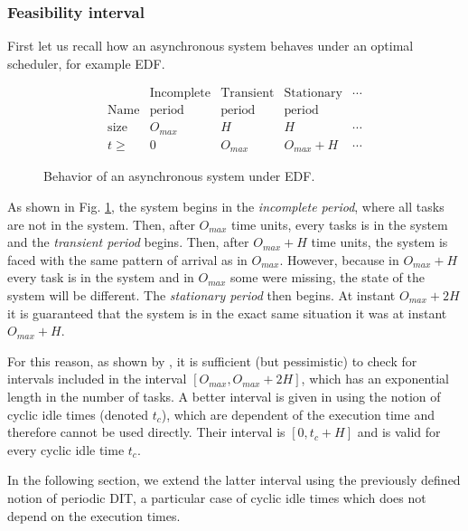 \documentclass[conference]{IEEEtran}
\begin{document}
		\subsubsection{Feasibility interval}
			First let us recall how an asynchronous system behaves under an optimal
			scheduler, for example EDF.

			\begin{figure}[h]
				\[
					\begin{array}{r||c|c|c|l}
									& \text{Incomplete} & \text{Transient}	& \text{Stationary} & \cdots \\
						\text{Name} & \text{period} 	& \text{period} 	& \text{period}  	& \\ \hline
						\text{size} & O_{max} 			& H 				& H 				& \cdots \\ \hline
						t \geqslant & 0 				& O_{max} 			& O_{max} + H 		& \cdots
					\end{array}
				\]
				\begin{center}
				\caption{Behavior of an asynchronous system under EDF.}
				\label{fig:asyncBehavior}
				\end{center}
			\end{figure}

			As shown in Fig. \ref{fig:asyncBehavior}, the system begins in the
			\emph{incomplete period}, where all tasks are not in the system. Then, after
			$O_{max}$ time units, every tasks is in the system and the \emph{transient
			period} begins. Then, after $O_{max} + H$ time units, the system is faced
			with the same pattern of arrival as in $O_{max}$. However, because in
			$O_{max} + H$ every task is in the system and in $O_{max}$ some were missing,
			the state of the system will be different. The \emph{stationary period} then
			begins. At instant $O_{max} + 2H$ it is guaranteed that the system is in the
			exact same situation it was at instant $O_{max} + H$.

			For this reason, as shown by \cite{leung1982complexity}, it is sufficient (but pessimistic) to
			check for
			intervals included in the interval $[O_{max}, O_{max} + 2H]$, which has an exponential length
			in the number of tasks. A better interval is given in \cite{choquet2004minimal} using the
			notion of cyclic idle times (denoted $t_c$), which are dependent of the execution
			time and therefore cannot be used directly. Their interval is $[0, t_c + H]$ and is valid for
			every cyclic idle time $t_c$.

			In the following section, we extend the latter interval using the previously defined notion
			of periodic DIT, a particular case of cyclic idle times which does not depend on the execution
			times.
\end{document}

